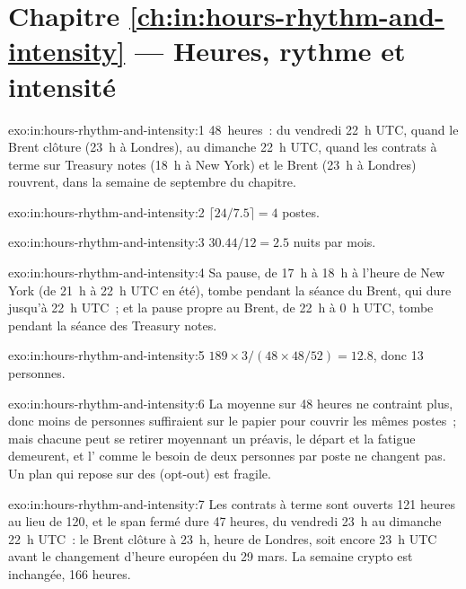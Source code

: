 \section*{Chapitre \ref{ch:in:hours-rhythm-and-intensity} --- Heures, rythme et intensité}

\begin{solution}{exo:in:hours-rhythm-and-intensity:1}
48~heures~: du vendredi 22~h UTC, quand le Brent clôture (23~h à Londres), au dimanche 22~h UTC, quand les contrats à terme sur Treasury notes
(18~h à New York) et le Brent (23~h à Londres) rouvrent, dans la semaine de septembre du chapitre.
\end{solution}

\begin{solution}{exo:in:hours-rhythm-and-intensity:2}
$\lceil 24/7.5\rceil=4$ postes.
\end{solution}

\begin{solution}{exo:in:hours-rhythm-and-intensity:3}
$30.44/12=2.5$ nuits par mois.
\end{solution}

\begin{solution}{exo:in:hours-rhythm-and-intensity:4}
Sa pause, de 17~h à 18~h à l'heure de New York (de 21~h à 22~h UTC en été), tombe pendant la séance du Brent, qui dure jusqu'à
22~h UTC~; et la pause propre au Brent, de 22~h à 0~h UTC, tombe pendant la séance des Treasury notes.
\end{solution}

\begin{solution}{exo:in:hours-rhythm-and-intensity:5}
$189\times3/(48\times48/52)=12.8$, donc 13 personnes.
\end{solution}

\begin{solution}{exo:in:hours-rhythm-and-intensity:6}
La moyenne sur 48 heures ne contraint plus, donc moins de personnes suffiraient sur le papier pour couvrir les mêmes postes~; mais chacune peut se retirer moyennant un préavis,
le départ et la fatigue demeurent, et l' comme le besoin de deux personnes par poste ne changent pas. Un
plan qui repose sur des  (opt-out) est fragile.
\end{solution}

\begin{solution}{exo:in:hours-rhythm-and-intensity:7}
Les contrats à terme sont ouverts 121 heures au lieu de 120, et le span fermé dure 47 heures, du vendredi 23~h au dimanche 22~h UTC~:
le Brent clôture à 23~h, heure de Londres, soit encore 23~h UTC avant le changement d'heure européen du 29 mars. La semaine crypto est
inchangée, 166 heures.
\end{solution}

